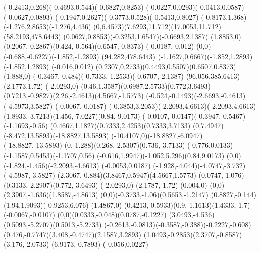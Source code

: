 {    \rcurveto(-0.2413,0.268)(-0.4693,0.544)(-0.6827,0.8253)
    \rcurveto(-0.0227,0.0293)(-0.0413,0.0587)(-0.0627,0.0893)
    \rcurveto(-0.1947,0.2627)(-0.3773,0.528)(-0.5413,0.8027)
    \rcurveto(-0.8173,1.368)(-1.276,2.8653)(-1.276,4.436)
    \rcurveto(0,6.4573)(7.6293,11.712)(17.0053,11.712)
    \moveto(58.2193,478.6443)
    \rcurveto(0.0627,0.8853)(-0.3253,1.6547)(-0.6693,2.1387)
    \rlineto(1.8853,0)
    \rcurveto(0.2067,-0.2867)(0.424,-0.564)(0.6547,-0.8373)
    \rlineto(-0.0187,-0.012)
    \rcurveto(0,0)(-0.688,-0.6227)(-1.852,-1.2893)
    \moveto(94.282,478.6443)
    \rcurveto(-1.1627,0.6667)(-1.852,1.2893)(-1.852,1.2893)
    \rlineto(-0.016,0.012)
    \rcurveto(0.2307,0.2733)(0.4493,0.5507)(0.6507,0.8373)
    \rlineto(1.888,0)
    \rcurveto(-0.3467,-0.484)(-0.7333,-1.2533)(-0.6707,-2.1387)
    \closepath
    \moveto(96.056,385.6413)
    \rlineto(2.1773,1.72)
    \rlineto(-2.0293,0)
    \rcurveto(0.46,1.3587)(0.6987,2.5733)(0.772,3.6493)
    \rcurveto(0.7213,-0.9827)(2.26,-2.4613)(4.5667,-1.5773)
    \rcurveto(-0.524,-0.1493)(-2.6693,-0.4613)(-4.5973,3.5827)
    \rlineto(-0.0067,-0.0187)
    \rcurveto(-0.3853,3.2053)(-2.2093,4.6613)(-2.2093,4.6613)
    \rcurveto(1.8933,-3.7213)(1.456,-7.0227)(0.84,-9.0173)
    \rcurveto(-0.0107,-0.0147)(-0.3947,-0.5467)(-1.1693,-0.56)
    \rcurveto(0.4667,1.1827)(0.7333,2.4253)(0.7333,3.7133)
    \rcurveto(0,7.4947)(-8.472,13.5893)(-18.8827,13.5893)
    \rcurveto(-10.4107,0)(-18.8827,-6.0947)(-18.8827,-13.5893)
    \rcurveto(0,-1.288)(0.268,-2.5307)(0.736,-3.7133)
    \rcurveto(-0.776,0.0133)(-1.1587,0.5453)(-1.1707,0.56)
    \rcurveto(-0.616,1.9947)(-1.052,5.296)(0.84,9.0173)
    \rcurveto(0,0)(-1.824,-1.456)(-2.2093,-4.6613)
    \rlineto(-0.0053,0.0187)
    \rcurveto(-1.928,-4.044)(-4.0747,-3.732)(-4.5987,-3.5827)
    \rcurveto(2.3067,-0.884)(3.8467,0.5947)(4.5667,1.5773)
    \rcurveto(0.0747,-1.076)(0.3133,-2.2907)(0.772,-3.6493)
    \rlineto(-2.0293,0)
    \rlineto(2.1787,-1.72)
    \rlineto(0.004,0)
    \rcurveto(0,0)(2.3907,-1.636)(1.8587,-4.8613)
    \rcurveto(0,0)(-0.3733,-1.06)(0.5653,-1.2147)
    \rcurveto(0.8827,-0.144)(1.94,1.9093)(-0.9253,6.076)
    \rlineto(1.4867,0)
    \rcurveto(0.4213,-0.5933)(0.9,-1.1613)(1.4333,-1.7)
    \rlineto(-0.0067,-0.0107)
    \rcurveto(0,0)(0.0333,-0.048)(0.0787,-0.1227)
    \rcurveto(3.0493,-4.536)(0.5093,-5.2707)(0.5013,-5.2733)
    \rcurveto(-0.2613,-0.0813)(-0.3587,-0.388)(-0.2227,-0.608)
    \rcurveto(0.476,-0.7747)(3.408,-0.4747)(2.1587,3.2893)
    \rcurveto(1.0493,-0.2853)(2.3707,-0.8587)(3.176,-2.0733)
    \rlineto(6.9173,-0.7893)
    \rlineto(-0.056,0.0227)
}
